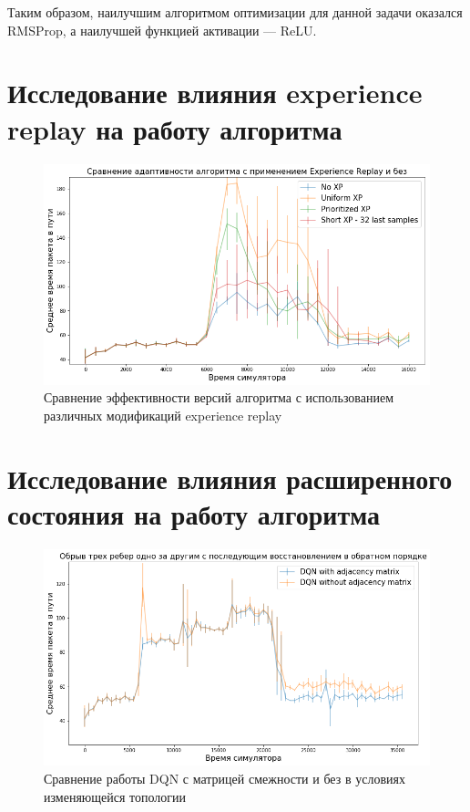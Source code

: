 \documentclass[specification, annotation]{itmo-student-thesis}
\begin{document}
Таким образом, наилучшим алгоритмом оптимизации для данной задачи оказался
RMSProp, а наилучшей функцией активации --- ReLU.

\section{Исследование влияния experience replay на работу алгоритма}

\begin{figure}[!h]
  \caption{Сравнение эффективности версий алгоритма с использованием различных
    модификаций experience replay}\label{experiments-xp-variants}
  \centering
  \includegraphics[scale=0.6]{experiments-xp-variants}
\end{figure}

\section{Исследование влияния расширенного состояния на работу алгоритма}

\begin{figure}[!h]
  \caption{Сравнение работы DQN с матрицей смежности и без в условиях
    изменяющейся топологии}\label{experiment-with-without-amatrix}
  \centering
  \includegraphics[scale=0.6]{experiment-with-without-amatrix}
\end{figure}
\end{document}
